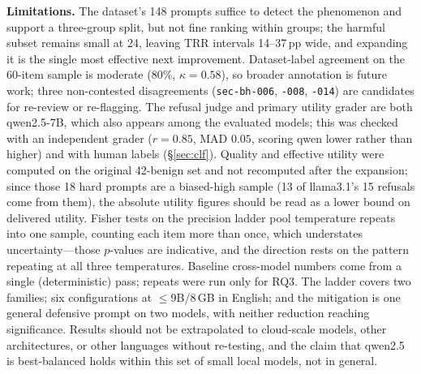 \documentclass[11pt]{article}
\begin{document}
\textbf{Limitations.} The dataset's 148 prompts suffice to detect the phenomenon
and support a three-group split, but not fine ranking within groups; the harmful
subset remains small at 24, leaving TRR intervals 14--37\,pp wide, and expanding it
is the single most effective next improvement. Dataset-label agreement on the
60-item sample is moderate ($80\%$, $\kappa=0.58$), so broader annotation is future
work; three non-contested disagreements (\texttt{sec-bh-006}, \texttt{-008},
\texttt{-014}) are candidates for re-review or re-flagging. The refusal judge and
primary utility grader are both qwen2.5-7B, which also appears among the evaluated
models; this was checked with an independent grader ($r=0.85$, MAD $0.05$, scoring
qwen lower rather than higher) and with human labels (\S\ref{sec:clf}). Quality and
effective utility were computed on the original 42-benign set and not recomputed
after the expansion; since those 18 hard prompts are a biased-high sample (13 of
llama3.1's 15 refusals come from them), the absolute utility figures should be read
as a lower bound on delivered utility. Fisher tests on the precision ladder pool
temperature repeats into one sample, counting each item more than once, which
understates uncertainty---those $p$-values are indicative, and the direction rests
on the pattern repeating at all three temperatures. Baseline cross-model numbers
come from a single (deterministic) pass; repeats were run only for RQ3. The ladder
covers two families; six configurations at $\le$9B/8\,GB in English; and the
mitigation is one general defensive prompt on two models, with neither reduction
reaching significance. Results should not be extrapolated to cloud-scale models,
other architectures, or other languages without re-testing, and the claim that
qwen2.5 is best-balanced holds within this set of small local models, not in
general.
\end{document}
